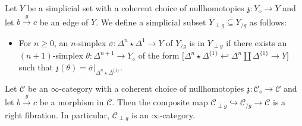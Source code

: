 \documentclass{tac}
\newcommand{\f}[1]{\mathfrak{#1}}
\newcommand{\s}[1]{\mathscr{#1}}
\newcommand{\ol}[1]{\overline{#1}}
\newcommand{\tx}[1]{\textnormal{#1}}
\begin{document}
\begin{construction} Let $Y$ be a simplicial set with a coherent choice of nullhomotopies $\f{z} : Y_\diamond \to Y$ and let $b\xrightarrow{g} c$ be an edge of $Y$.  We define a simplicial subset $Y_{\perp g} \subseteq Y_{/g}$ as follows:
\begin{itemize}
\item For $n\geq 0$, an $n$-simplex $\ol{\sigma} : \Delta^n \star \Delta^1 \to Y$ of $Y_{/g}$ is in $Y_{\perp g}$ if there exists an $(n+1)$-simplex $\theta : \Delta^{n+1} \to Y_\diamond$ of the form $\big[ \Delta^n \star \Delta^{\{1\}} \hookleftarrow \Delta^n \coprod \Delta^{\{1\}} \to Y \big]$ such that $\f{z}(\theta) = \ol{\sigma}|_{\Delta^n \star \Delta^{\{1\}}}$.
\end{itemize}
\end{construction}
\begin{lemma}[\tx{}\cite{thesis}, 1.5.8]  Let $\s{C}$ be an $\infty$-category with a coherent choice of nullhomotopies $\f{z} : \s{C}_\diamond \to \s{C}$ and let $b\xrightarrow{g} c$ be a morphism in $\s{C}$.  Then the composite map $\s{C}_{\perp g} \hookrightarrow \s{C}_{/g} \to \s{C}$ is a right fibration.  In particular, $ \s{C}_{\perp g}$ is an $\infty$-category.
\end{lemma}
\end{document}
